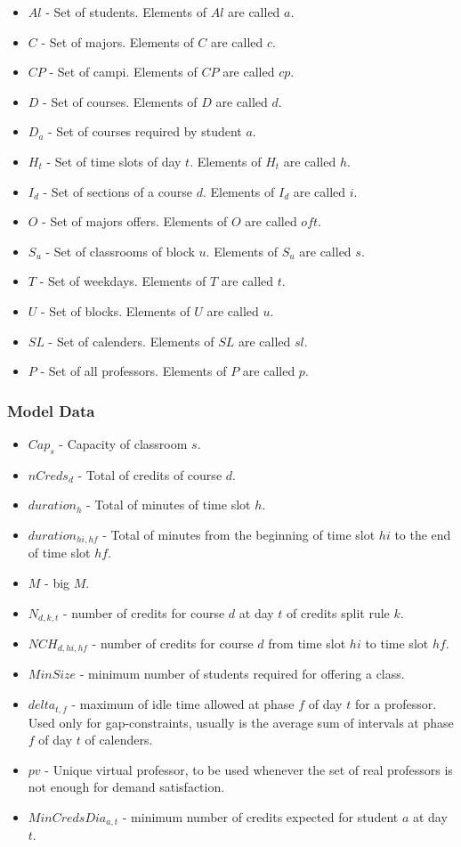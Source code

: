 \begin{itemize}
\item $Al$ - Set of students. Elements of $Al$ are called $a$.
\item $C$ - Set of majors. Elements of $C$ are called $c$.
\item $CP$ - Set of campi. Elements of $CP$ are called $cp$.
\item $D$ - Set of courses. Elements of $D$ are called $d$.
\item $D_{a}$ - Set of courses required by student $a$.
\item $H_{t}$ - Set of time slots of day $t$. Elements of $H_{t}$ are called $h$.
\item $I_{d}$ - Set of sections of a course $d$. Elements of $I_{d}$ are called $i$.
\item $O$ - Set of majors offers. Elements of $O$ are called $oft$.
\item $S_{u}$ - Set of classrooms of block $u$. Elements of $S_{u}$ are called $s$.
\item $T$ - Set of weekdays. Elements of $T$ are called $t$.
\item $U$ - Set of blocks. Elements of $U$ are called $u$.
\item $SL$ - Set of calenders. Elements of $SL$ are called $sl$.
\item $P$ - Set of all professors. Elements of $P$ are called $p$.
\end{itemize}

\subsubsection{Model Data}

\begin{itemize}
\item $Cap_{s}$ - Capacity of classroom $s$.
\item $nCreds_{d}$ - Total of credits of course $d$.
\item $duration_{h}$ - Total of minutes of time slot $h$.
\item $duration_{hi,hf}$ - Total of minutes from the beginning of time slot $hi$ to the end of time slot $hf$.
\item $M$ - big $M$.
\item $N_{d,k,t}$ - number of credits for course $d$ at day $t$ of credits split rule $k$.
\item $NCH_{d,hi,hf}$ - number of credits for course $d$ from time slot $hi$ to time slot $hf$.
\item $MinSize$ - minimum number of students required for offering a class.
\item $delta_{t,f}$ - maximum of idle time allowed at phase $f$ of day $t$ for a professor. Used only for gap-constraints, usually is the average sum of intervals at phase $f$ of day $t$ of calenders.
\item $pv$ - Unique virtual professor, to be used whenever the set of real professors is not enough for demand satisfaction.
\item $MinCredsDia_{a,t}$ - minimum number of credits expected for student $a$ at day $t$.
\end{itemize}

